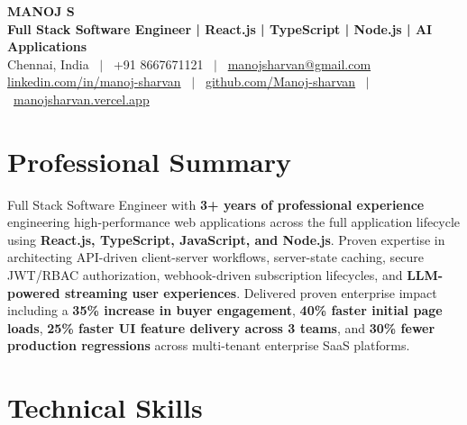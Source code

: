 \documentclass[letterpaper,10pt]{article}
\begin{document}

\begin{center}
  {\LARGE \textbf{MANOJ S}}\\[2pt]
  \textbf{Full Stack Software Engineer | React.js | TypeScript | Node.js | AI Applications}\\[3pt]
  Chennai, India \ $|$ \ +91 8667671121 \ $|$ \ \href{mailto:manojsharvan@gmail.com}{manojsharvan@gmail.com}\\[1pt]
  \href{https://linkedin.com/in/manoj-sharvan}{linkedin.com/in/manoj-sharvan} \ $|$ \ \href{https://github.com/Manoj-sharvan}{github.com/Manoj-sharvan} \ $|$ \ \href{https://manojsharvan.vercel.app}{manojsharvan.vercel.app}
\end{center}

\vspace{-3pt}


\section{Professional Summary}

Full Stack Software Engineer with \textbf{3+ years of professional experience} engineering high-performance web applications across the full application lifecycle using \textbf{React.js, TypeScript, JavaScript, and Node.js}. Proven expertise in architecting API-driven client-server workflows, server-state caching, secure JWT/RBAC authorization, webhook-driven subscription lifecycles, and \textbf{LLM-powered streaming user experiences}. Delivered proven enterprise impact including a \textbf{35\% increase in buyer engagement}, \textbf{40\% faster initial page loads}, \textbf{25\% faster UI feature delivery across 3 teams}, and \textbf{30\% fewer production regressions} across multi-tenant enterprise SaaS platforms.


\section{Technical Skills}
\end{document}
